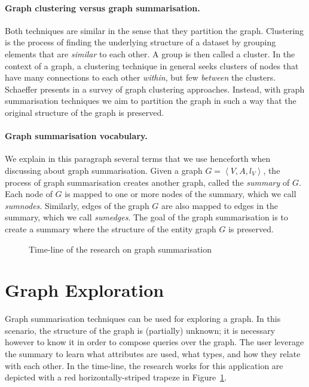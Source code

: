 \paragraph{Graph clustering versus graph summarisation.}

Both techniques are similar in the sense that they partition the graph.
Clustering is the process of finding the underlying structure of a dataset by grouping elements that are \emph{similar} to each other. A group is then called a cluster. In the context of a graph, a clustering technique in general seeks clusters of nodes that have many connections to each other \emph{within}, but few \emph{between} the clusters. Schaeffer presents in \cite{schaeffer:2007:graph} a survey of graph clustering approaches. Instead, with graph summarisation techniques we aim to partition the graph in such a way that the original structure of the graph is preserved.

\paragraph{Graph summarisation vocabulary.}

We explain in this paragraph several terms that we use henceforth when discussing about graph summarisation.
Given a graph $G = \left\langle V, A, l_V \right\rangle$, the process of graph summarisation creates another graph, called the \emph{summary} of $G$. Each node of $G$ is mapped to one or more nodes of the summary, which we call \emph{sumnodes}. Similarly, edges of the graph $G$ are also mapped to edges in the summary, which we call \emph{sumedges}. The goal of the graph summarisation is to create a summary where the structure of the entity graph $G$ is preserved.

\begin{figure}
	\resizebox{\textwidth}{!}{
		
	}
	\caption{Time-line of the research on graph summarisation}
	\label{fig:timeline}
\end{figure}

\section{Graph Exploration}
\label{chap3:review:graph-exploration}

Graph summarisation techniques can be used for exploring a graph. In this scenario, the structure of the graph is (partially) unknown; it is necessary however to know it in order to compose queries over the graph. The user leverage the summary to learn what attributes are used, what types, and how they relate with each other. In the time-line, the research works for this application are depicted with a red horizontally-striped trapeze in Figure~\ref{fig:timeline}.\\

